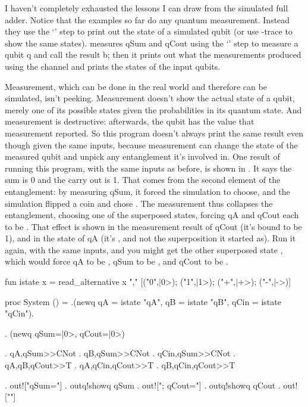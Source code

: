 I haven't completely exhausted the lessons I can draw from the simulated full adder. Notice that the examples so far do any quantum measurement. Instead they use the `' step to print out the state of a simulated qubit (or use -trace to show the same states).  measures qSum and qCout using the `' step to measure a qubit q and call the result b; then it prints out what the measurements produced using the  channel and prints the states of the input qubits. 

Measurement, which can be done in the real world and therefore can be simulated, isn't peeking. Measurement doesn't show the actual state of a qubit, merely one of its possible states given the probabilities in its quantum state. And measurement is destructive: afterwards, the qubit has the value that measurement reported. So this program doesn't always print the same result even though given the same inputs, because measurement can change the state of the measured qubit and unpick any entanglement it's involved in. One result of running this program, with the same inputs as before, is shown in . It says the sum is 0 and the carry out is 1. That comes from the second element of the entanglement: by measuring qSum, it forced the simulation to choose, and the simulation flipped a coin and chose \onezeroone{}. The measurement thus collapses the entanglement, choosing one of the superposed states, forcing qA and qCout each to be \one{}. That effect is shown in the measurement result of qCout (it's bound to be 1), and in the state of qA (it's \one{}, and not the superposition it started as). Run it again, with the same inputs, and you might get the other superposed state \zeroonezero{}, which would force qA to be \zero{}, qSum to be \one{}, and qCout to be \zero{}.
 
\mvb{\Cogginswithinputandmeasurement}
fun istate x = 
  read_alternative x "," [("0",|0>); ("1",|1>); ("+",|+>); ("-",|->)]

proc System () =
  .(newq qA   = istate "qA", 
         qB   = istate "qB",
         qCin = istate "qCin").
  
  . (newq qSum=|0>, qCout=|0>) 
  
  . qA,qSum>>CNot  . qB,qSum>>CNot    . qCin,qSum>>CNot 
  . qA,qB,qCout>>T . qA,qCin,qCout>>T . qB,qCin,qCout>>T 
  
  . out!["qSum="] . outq!showq qSum . out!["; qCout="] . outq!showq qCout .  out!["\n"] 
  
